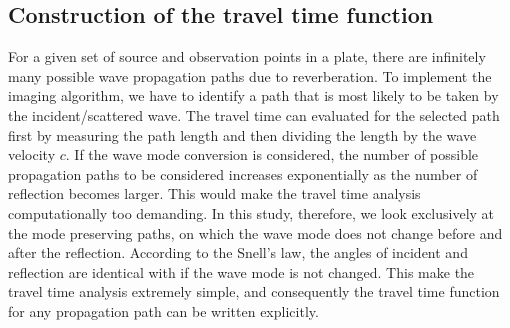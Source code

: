 ﻿\documentclass[11pt,a4j]{article}
\begin{document}
\subsection{Construction of the travel time function}
\hspace{\parindent}
For a given set of source and observation points in a plate, 
there are infinitely many possible wave propagation paths 
due to reverberation.
To implement the imaging algorithm, we have to identify a path that 
is most likely to be taken by the incident/scattered wave. 
The travel time can evaluated for the selected path first by 
measuring the path length and then dividing the length by the 
wave velocity $c$.
If the wave mode conversion is considered, the number of possible 
propagation paths to be considered increases exponentially as the 
number of reflection becomes larger. This would make the travel time 
analysis computationally too demanding. In this study, therefore, 
we look exclusively at the mode preserving paths, on which the wave 
mode does not change before and after the reflection.
According to the Snell's law, the angles of incident and reflection are 
identical with if the wave mode is not changed.
This make the travel time analysis extremely simple, and consequently 
the travel time function for any propagation path can be written explicitly. 
\end{document}
